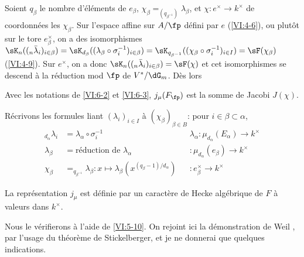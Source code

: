 Soient $q_\beta$ le nombre d'\'el\'ements de $e_\beta$, 
$\chi_\beta=_{(q_{\beta^{-1}})} \lambda_\beta$, et 
$\chi:e^\times \to k^\times$ de coordonn\'ees les $\chi_\beta$. Sur l'espace 
affine sur $A/\fp$ d\'efini par $e$ (\ref{VI:4-6}), ou plut\^ot sur le tore 
$e_\beta^\times$, on a des isomorphismes 
$\sK_n((_n\bar\lambda_i)_{i\in\beta}) = \sK_{d_\beta}((\lambda_\beta \circ \sigma_i^{-1})_{i\in\beta}) =\sK_{q_{\beta^{-1}}}((\chi_\beta\circ \sigma_i^{-1})_{i\in I}) = \sF(\chi_\beta)$ (\ref{VI:4-9}). 
Sur $e^\times$, on a donc $\sK_n((_n\bar\lambda_i)_{i\in \beta}) = \sF(\chi)$ 
et cet isomorphismes se descend \`a la r\'eduction mod $\fp$ de $V^\ast/\dG_m$. 
D\`es lors





\begin{proposition_}\label{VI:6-4}
Avec les notations de \ref{VI:6-2} et \ref{VI:6-3}, $j_\mu(F_\fp)$ est la 
somme de Jacobi $J(\chi)$. 
\end{proposition_}

R\'ecrivons les formules liant $(\lambda_i)_{i\in I}$ \`a 
$(\chi_\beta)_{\beta\in B}$: pour $i\in \beta\subset \alpha$, 
\begin{align*}
  _{d_\alpha} \lambda_i &= \lambda_\alpha\circ \sigma_i^{-1} && \lambda_\alpha:\mu_{d_\alpha}(E_\alpha) \to k^\times \\
  \lambda_\beta &= \text{r\'eduction de $\lambda_\alpha$} && :\mu_{d_\alpha}(e_\beta) \to k^\times \\
  \chi_\beta &= _{q_{\beta^{-1}}}\lambda_\beta: x\mapsto \lambda_\beta(x^{(q_\beta-1)/d_\alpha}) && :e_\beta^\times \to k^\times 
\end{align*}





\begin{theorem_}\label{VI:6-5}
La repr\'esentation $j_\mu$ est d\'efinie par un caract\`ere de Hecke 
alg\'ebrique de $F$ \`a valeurs dans $k^\times$. 
\end{theorem_}

Nous le v\'erifierons \`a l'aide de \ref{VI:5-10}. On rejoint ici la 
d\'emonstration de Weil \cite{we52,we74-2}, par l'usage du th\'eor\`eme de 
Stickelberger, et je ne donnerai que quelques indications. 





\subsection{}\label{VI:6-6}


